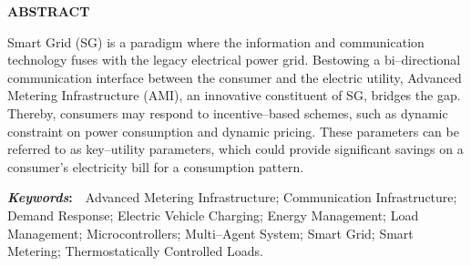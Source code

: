 {}
\centerline{\normalsize\textbf{ABSTRACT}}%
\vspace{0cm}
\smallskip

Smart Grid (SG) is a paradigm where the information and communication technology fuses with the legacy electrical power grid. Bestowing a bi--directional communication interface between the consumer and the electric utility, Advanced Metering Infrastructure (AMI), an innovative constituent of SG, bridges the gap. Thereby, consumers may respond to incentive--based schemes, such as dynamic constraint on power consumption and dynamic pricing. These parameters can be referred to as key--utility parameters, which could provide significant savings on a consumer's electricity bill for a consumption pattern.

\noindent \textbf{\textit{Keywords}:}~~Advanced Metering Infrastructure; Communication Infrastructure; Demand Response; Electric Vehicle Charging; Energy Management; Load Management; Microcontrollers; Multi--Agent System; Smart Grid; Smart Metering; Thermostatically Controlled Loads.
\newpage